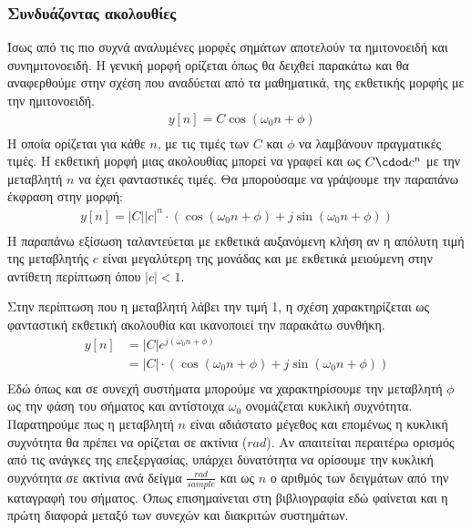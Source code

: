\documentclass[breaklines=true, 12pt]{article}
\begin{document}
\subsubsection{Συνδυάζοντας ακολουθίες}
\label{sec:orgce84c52}
Ίσως από τις πιο συχνά αναλυμένες μορφές σημάτων αποτελούν  τα
ημιτονοειδή και συνημιτονοειδή. Η γενική μορφή ορίζεται
όπως θα δειχθεί παρακάτω και θα αναφερθούμε στην σχέση που αναδύεται από
τα μαθηματικά, της εκθετικής μορφής με την ημιτονοειδή.
\begin{equation}
\begin{align}
&y[n] = C \cos(\omega_{0}n + \phi) \\
\end{align}
\end{equation}
Η οποία ορίζεται για κάθε \(n\), με τις τιμές των \(C\)
και \(\phi\) να λαμβάνουν πραγματικές τιμές. Η εκθετική μορφή μιας ακολουθίας
μπορεί να γραφεί και ως \(C \cdod c^{n}\) με την μεταβλητή \(n\) να έχει φανταστικές
τιμές. Θα μπορούσαμε να γράψουμε την παραπάνω έκφραση στην μορφή:
\begin{equation}
\begin{align}
y[n] = |C||c|^{n} \cdot(\cos(\omega_{0}n+\phi)+ j\sin(\omega_{0}n+\phi)) \\
\end{align}
\end{equation}
Η παραπάνω εξίσωση ταλαντεύεται με εκθετικά αυξανόμενη κλήση αν η απόλυτη
τιμή της μεταβλητής \(c\) είναι μεγαλύτερη της μονάδας και με εκθετικά
μειούμενη στην αντίθετη περίπτωση όπου \(|c|<1\).

Στην περίπτωση που η μεταβλητή λάβει την τιμή 1, η σχέση χαρακτηρίζεται
ως φανταστική εκθετική ακολουθία και ικανοποιεί την παρακάτω συνθήκη.
\begin{equation}
\begin{align}
y[n] &= |C| e^{j(\omega_{0}n+\phi)} \\
&= |C|\cdot(\cos(\omega_{0}n+\phi)+ j\sin(\omega_{0}n+\phi)) \\
\end{align}
\end{equation}
Εδώ όπως και σε συνεχή συστήματα μπορούμε να χαρακτηρίσουμε την μεταβλητή
\(\phi\) ως την φάση του σήματος και αντίστοιχα \(\omega_{0}\) ονομάζεται κυκλική συχνότητα.
Παρατηρούμε πως η μεταβλητή \(n\) είναι αδιάστατο μέγεθος και επομένως η κυκλική
συχνότητα θα πρέπει να ορίζεται σε ακτίνια (\(rad\)). Αν απαιτείται περαιτέρω
ορισμός από τις ανάγκες της επεξεργασίας, υπάρχει δυνατότητα να ορίσουμε την
κυκλική συχνότητα σε ακτίνια ανά δείγμα \(\displaystyle \frac{rad}{sample}\) και ως \(n\) ο αριθμός των δειγμάτων
από την καταγραφή του σήματος. Όπως επισημαίνεται στη βιβλιογραφία εδώ φαίνεται
και η πρώτη διαφορά μεταξύ των συνεχών και διακριτών συστημάτων.
\end{document}
